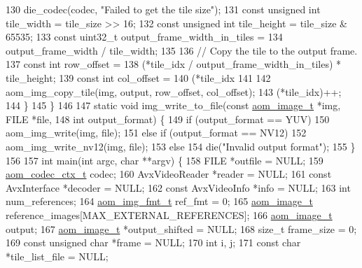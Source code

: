 \begin{DoxyCodeInclude}
{130       die\_codec(codec, \textcolor{stringliteral}{"Failed to get the tile size"});
131     \textcolor{keyword}{const} \textcolor{keywordtype}{unsigned} \textcolor{keywordtype}{int} tile\_width = tile\_size >> 16;
132     \textcolor{keyword}{const} \textcolor{keywordtype}{unsigned} \textcolor{keywordtype}{int} tile\_height = tile\_size & 65535;
133     \textcolor{keyword}{const} uint32\_t output\_frame\_width\_in\_tiles =
134         output\_frame\_width / tile\_width;
135 
136     \textcolor{comment}{// Copy the tile to the output frame.}
137     \textcolor{keyword}{const} \textcolor{keywordtype}{int} row\_offset =
138         (*tile\_idx / output\_frame\_width\_in\_tiles) * tile\_height;
139     \textcolor{keyword}{const} \textcolor{keywordtype}{int} col\_offset =
140         (*tile\_idx %
141 
142     aom\_img\_copy\_tile(img, output, row\_offset, col\_offset);
143     (*tile\_idx)++;
144   \}
145 \}
146 
147 \textcolor{keyword}{static} \textcolor{keywordtype}{void} img\_write\_to\_file(\textcolor{keyword}{const} \hyperlink{structaom__image}{aom\_image\_t} *img, FILE *file,
148                               \textcolor{keywordtype}{int} output\_format) \{
149   \textcolor{keywordflow}{if} (output\_format == YUV)
150     aom\_img\_write(img, file);
151   \textcolor{keywordflow}{else} \textcolor{keywordflow}{if} (output\_format == NV12)
152     aom\_img\_write\_nv12(img, file);
153   \textcolor{keywordflow}{else}
154     die(\textcolor{stringliteral}{"Invalid output format"});
155 \}
156 
157 \textcolor{keywordtype}{int} main(\textcolor{keywordtype}{int} argc, \textcolor{keywordtype}{char} **argv) \{
158   FILE *outfile = NULL;
159   \hyperlink{structaom__codec__ctx}{aom\_codec\_ctx\_t} codec;
160   AvxVideoReader *reader = NULL;
161   \textcolor{keyword}{const} AvxInterface *decoder = NULL;
162   \textcolor{keyword}{const} AvxVideoInfo *info = NULL;
163   \textcolor{keywordtype}{int} num\_references;
164   \hyperlink{aom__image_8h_ab71efff8c7f49380fad23b93bc2e9bfc}{aom\_img\_fmt\_t} ref\_fmt = 0;
165   \hyperlink{structaom__image}{aom\_image\_t} reference\_images[MAX\_EXTERNAL\_REFERENCES];
166   \hyperlink{structaom__image}{aom\_image\_t} output;
167   \hyperlink{structaom__image}{aom\_image\_t} *output\_shifted = NULL;
168   \textcolor{keywordtype}{size\_t} frame\_size = 0;
169   \textcolor{keyword}{const} \textcolor{keywordtype}{unsigned} \textcolor{keywordtype}{char} *frame = NULL;
170   \textcolor{keywordtype}{int} i, j;
171   \textcolor{keyword}{const} \textcolor{keywordtype}{char} *tile\_list\_file = NULL;
}
\end{DoxyCodeInclude}
